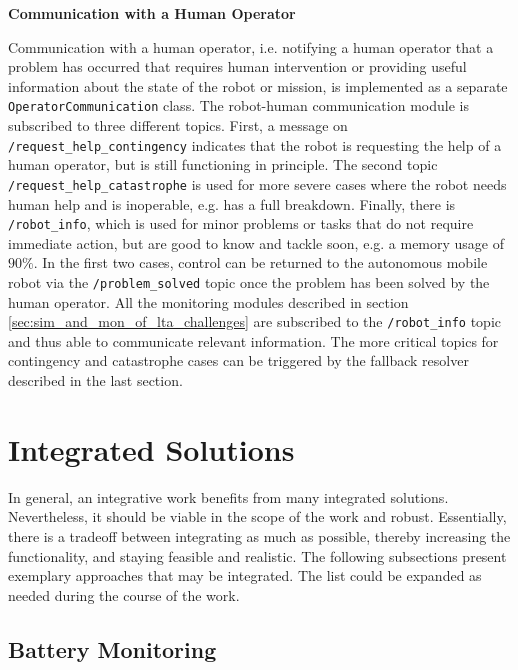 \documentclass[english, master, utf8]{base/thesis_KBS}
\newcommand{\code}[1]{\colorbox{light-gray}{\texttt{#1}}}
\begin{document}
\noindent
\textbf{Communication with a Human Operator}\newline

\noindent
Communication with a human operator, i.e. notifying a human operator that a problem has occurred that requires human intervention or providing useful information about the state
of the robot or mission, is implemented as a separate \code{OperatorCommunication} class. The robot-human communication module is subscribed to three different topics. First,
a message on \code{/request\_help\_contingency} indicates that the robot is requesting the help of a human operator, but is still functioning in principle. The second topic
\code{/request\_help\_catastrophe} is used for more severe cases where the robot needs human help and is inoperable, e.g. has a full breakdown. Finally, there is \code{/robot\_info},
which is used for minor problems or tasks that do not require immediate action, but are good to know and tackle soon, e.g. a memory usage of $90\%$. In the first two cases, control
can be returned to the autonomous mobile robot via the \code{/problem\_solved} topic once the problem has been solved by the human operator. All the monitoring modules described
in section \ref{sec:sim_and_mon_of_lta_challenges} are subscribed to the \code{/robot\_info} topic and thus able to communicate relevant information. The more critical topics for
contingency and catastrophe cases can be triggered by the fallback resolver described in the last section.

\chapter{Integrated Solutions}

In general, an integrative work benefits from many integrated solutions. Nevertheless, it should be viable in the scope of the work and robust.
Essentially, there is a tradeoff between integrating as much as possible, thereby increasing the functionality, and staying feasible and realistic.
The following subsections present exemplary approaches that may be integrated. The list could be expanded as needed during the course of the work.

\section{Battery Monitoring}
\label{sec:battery_monitoring}
\end{document}
